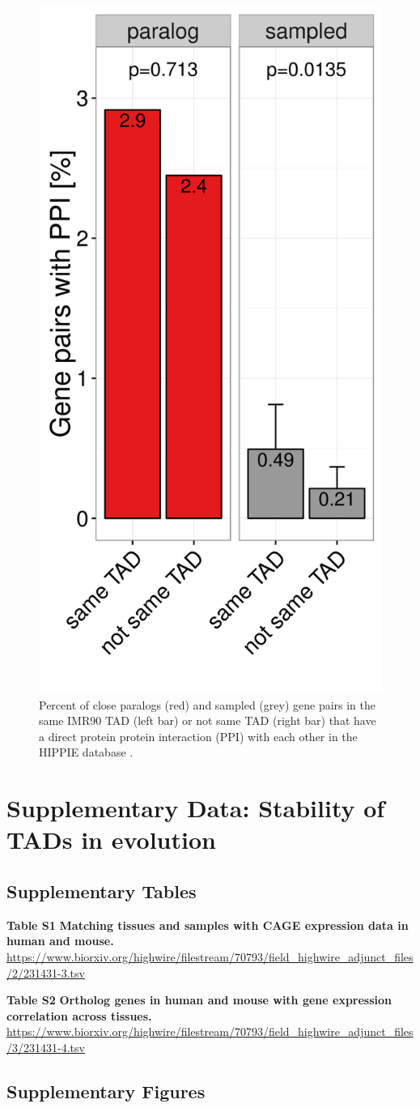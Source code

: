 \documentclass[a4paper,twoside=true,openright,parskip=full,chapterprefix=true,11pt,headings=normal,bibliography=totoc,listof=totoc,titlepage=on,captions=tableabove,draft=false]{scrreprt}
\theoremstyle{definition}
\theoremstyle{definition}
\theoremstyle{definition}
\theoremstyle{remark}
\begin{document}
\begin{figure}

{\centering \includegraphics[width=0.3\linewidth]{figures/paralog/SI/figS14} 

}

\caption{Percent of close paralogs (red) and sampled (grey) gene pairs
in the same IMR90 TAD (left bar) or not same TAD (right bar) that have a
direct protein protein interaction (PPI) with each other in the HIPPIE
database \citep{Schaefer2012}.}\label{fig:PPI}
\end{figure}






\hypertarget{sup-tad-evolution}{%
\chapter{Supplementary Data: Stability of TADs in
evolution}\label{sup-tad-evolution}}

\hypertarget{TadEvoSupTab}{%
\section{Supplementary Tables}\label{TadEvoSupTab}}

\textbf{Table S1} \textbf{Matching tissues and samples with CAGE
expression data in human and mouse.}
\url{https://www.biorxiv.org/highwire/filestream/70793/field_highwire_adjunct_files/2/231431-3.tsv}

\textbf{Table S2} \textbf{Ortholog genes in human and mouse with gene
expression correlation across tissues.}
\url{https://www.biorxiv.org/highwire/filestream/70793/field_highwire_adjunct_files/3/231431-4.tsv}

\hypertarget{supplementary-figures}{%
\section{Supplementary Figures}\label{supplementary-figures}}
\end{document}
